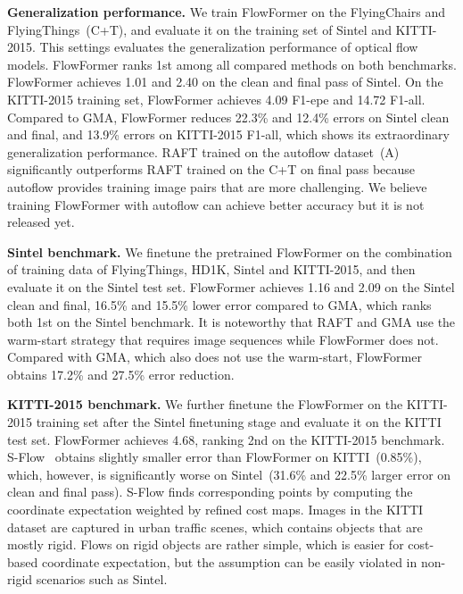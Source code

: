 \noindent \textbf{Generalization performance.}
We train FlowFormer on the FlyingChairs and FlyingThings~(C+T), and evaluate it on the training set of Sintel and KITTI-2015. This settings evaluates the generalization performance of optical flow models.
FlowFormer ranks 1st among all compared methods on both benchmarks.
FlowFormer achieves 1.01 and 2.40 on the clean and final pass of Sintel.
On the KITTI-2015 training set, FlowFormer achieves 4.09 F1-epe and 14.72 F1-all.
Compared to GMA, FlowFormer reduces 22.3\% and 12.4\% errors on Sintel clean and final, and 13.9\% errors on KITTI-2015 F1-all, which shows its extraordinary generalization performance.
RAFT trained on the autoflow dataset~(A) significantly outperforms RAFT trained on the C+T on final pass because autoflow provides training image pairs that are more challenging.
We believe training FlowFormer with autoflow can achieve better accuracy but it is not released yet.

\noindent \textbf{Sintel benchmark.}
We finetune the pretrained FlowFormer on the combination of training data of FlyingThings, HD1K, Sintel and KITTI-2015, and then evaluate it on the Sintel test set.
FlowFormer achieves 1.16 and 2.09 on the Sintel clean and final, 16.5\% and 15.5\% lower error compared to GMA, which ranks both 1st on the Sintel benchmark.
It is noteworthy that RAFT and GMA use the warm-start strategy that requires image sequences while FlowFormer does not.
Compared with GMA, which also does not use the warm-start, FlowFormer obtains 17.2\% and 27.5\% error reduction.


\noindent \textbf{KITTI-2015 benchmark.}
We further finetune the FlowFormer on the KITTI-2015 training set after the Sintel finetuning stage and evaluate it on the KITTI test set.
FlowFormer achieves 4.68, ranking 2nd on the KITTI-2015 benchmark.
S-Flow~\cite{zhang2021separable} obtains slightly smaller error than FlowFormer on KITTI~(0.85\%), which, however, is significantly worse on Sintel~(31.6\% and 22.5\% larger error on clean and final pass).
S-Flow finds corresponding points by computing the coordinate expectation weighted by refined cost maps.
Images in the KITTI dataset are captured in urban traffic scenes, which contains objects that are mostly rigid.
Flows on rigid objects are rather simple, which is easier for cost-based coordinate expectation, but the assumption can be easily violated in non-rigid scenarios such as Sintel.

